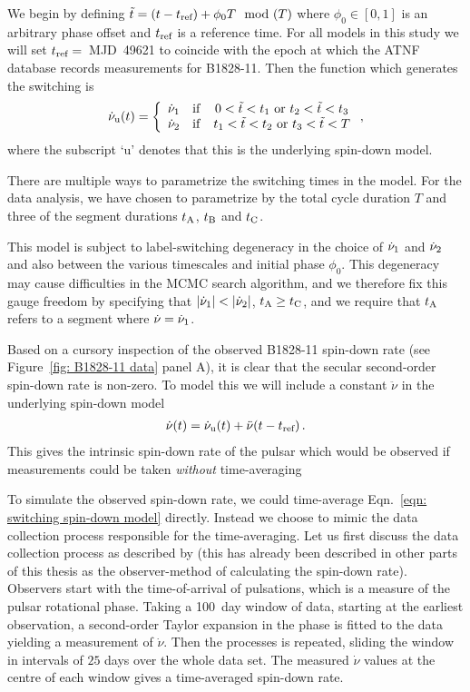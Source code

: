 \documentclass[../full_thesis/full_thesis.tex]{subfiles}
\begin{document}
We begin by defining $\tilde{t} = (t-t_{\textrm{ref}}) + \phi_{0}T\mod(T)$ where $\phi_0 \in [0,
1]$ is an arbitrary phase offset and $t_{\textrm{ref}}$ is a reference time. For all models
in this study we will set $t_{\textrm{ref}}=$~MJD~49621 to coincide with the epoch at which
the ATNF database \citet{Manchester1977} records measurements for B1828-11.
Then the function which generates the switching is
\begin{align}
\dot{\nu}_{\mathrm{u}}(t) = \left\{
    \begin{array}{ccc}
    \dot{\nu}_{1} & \mathrm{if} & 0 < \tilde{t} < t_{1}
    \textrm{ or } t_{2} < \tilde{t} < t_{3} \\
    \dot{\nu}_{2} & \mathrm{if} & t_{1} < \tilde{t} < t_{2}
    \textrm{ or } t_{3} < \tilde{t} < T\\
    \end{array}
    \right. ,
\end{align}
where the subscript `u' denotes that this is the underlying spin-down model.

There are multiple ways to parametrize the switching times in the model. For
the data analysis, we have chosen to parametrize by the total cycle duration
$T$ and three of the segment durations $t_{\mathrm{A}}$, $t_{\mathrm{B}}$ and $t_{\mathrm{C}}$.

This model is subject to label-switching degeneracy in the choice of
$\dot{\nu}_{1}$ and $\dot{\nu}_{2}$ and also between the various timescales and
initial phase $\phi_0$.  This degeneracy may cause difficulties in the MCMC
search algorithm, and we therefore fix this gauge freedom by specifying that
$|\dot{\nu}_{1}| < |\dot{\nu}_{2}|$, $t_{\mathrm{A}} \ge t_{\mathrm{C}}$, and we require that $t_{\mathrm{A}}$
refers to a segment where $\dot{\nu} = \dot{\nu}_{1}$.

Based on a cursory inspection of the observed B1828-11 spin-down rate (see
Figure~\ref{fig: B1828-11 data} panel A), it is clear that the secular
second-order spin-down rate is non-zero. To model this we will include a
constant $\ddot{\nu}$ in the underlying spin-down model
\begin{align}
    \dot{\nu}(t) = \dot{\nu}_{\mathrm{u}}(t) + \ddot{\nu}(t-t_{\textrm{ref}})\,.
\label{eqn: switching spin-down model}
\end{align}
This gives the intrinsic spin-down rate of the pulsar which would be observed if
measurements could be taken \emph{without} time-averaging

To simulate the observed spin-down rate, we could time-average Eqn.~\eqref{eqn:
switching spin-down model} directly. Instead we choose to mimic the data
collection process responsible for the time-averaging. Let
us first discuss the data collection process as described by \citet{Lyne2010} (this
has already been described in other parts of this thesis as the observer-method of
calculating the spin-down rate).
Observers start with the time-of-arrival of pulsations, which is a measure of
the pulsar rotational phase. Taking a 100~day window of data, starting at the
earliest observation, a second-order Taylor expansion in the phase is fitted to
the data yielding a measurement of $\dot{\nu}$. Then the processes is repeated,
sliding the window in intervals of $25$ days over the whole data set. The
measured $\dot{\nu}$ values at the centre of each window gives a time-averaged
spin-down rate.
\end{document}
